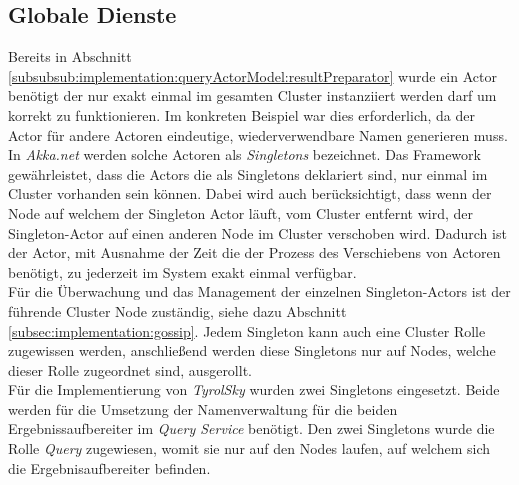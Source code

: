 \subsection{Globale Dienste}
\label{subsec:implementation:singeltons}
Bereits in Abschnitt \ref{subsubsub:implementation:queryActorModel:resultPreparator} wurde ein Actor benötigt der nur exakt einmal im gesamten Cluster instanziiert werden darf um korrekt zu funktionieren. Im konkreten Beispiel war dies erforderlich, da der Actor für andere Actoren eindeutige, wiederverwendbare Namen generieren muss. In \textit{Akka.net} werden solche Actoren als \textit{Singletons} bezeichnet. Das Framework gewährleistet, dass die Actors die als Singletons deklariert sind, nur einmal im Cluster vorhanden sein können. Dabei wird auch berücksichtigt, dass wenn der Node auf welchem der Singleton Actor läuft, vom Cluster entfernt wird, der Singleton-Actor auf einen anderen Node im Cluster verschoben wird. Dadurch ist der Actor, mit Ausnahme der Zeit die der Prozess des Verschiebens von Actoren benötigt, zu jederzeit im System exakt einmal verfügbar. \\
Für die Überwachung und das Management der einzelnen Singleton-Actors ist der führende Cluster Node zuständig, siehe dazu Abschnitt \ref{subsec:implementation:gossip}. Jedem Singleton kann auch eine Cluster Rolle zugewissen werden, anschließend werden diese Singletons nur auf Nodes, welche dieser Rolle zugeordnet sind, ausgerollt. \\
Für die Implementierung von \textit{TyrolSky} wurden zwei Singletons eingesetzt. Beide werden für die Umsetzung der Namenverwaltung für die beiden Ergebnissaufbereiter im \textit{Query Service} benötigt. Den zwei Singletons wurde die Rolle \textit{Query} zugewiesen, womit sie nur auf den Nodes laufen, auf welchem sich die Ergebnisaufbereiter befinden.

